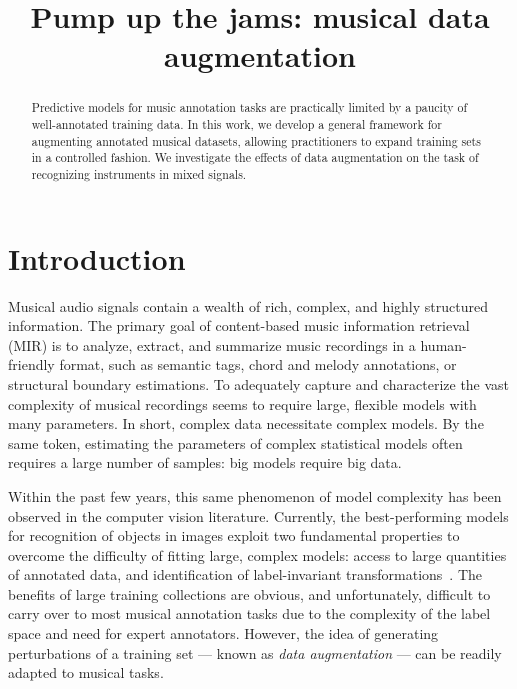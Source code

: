 \documentclass{article}
\title{Pump up the jams: musical data augmentation}
\begin{document}
%
\maketitle
%
\begin{abstract}
Predictive models for music annotation tasks are practically limited by a paucity of
well-annotated training data.
In this work, we develop a general framework for augmenting annotated musical datasets,
allowing practitioners to expand training sets in a controlled fashion.
We investigate the effects of data augmentation on the task of recognizing instruments
in mixed signals.
\end{abstract}
%
\section{Introduction}
\label{sec:introduction}


Musical audio signals contain a wealth of rich, complex, and highly structured
information.  The primary goal of content-based music information retrieval (MIR) is to
analyze, extract, and summarize music recordings in a human-friendly
format, such as semantic tags, chord and melody annotations, or structural boundary
estimations.  To adequately capture and characterize the vast complexity of musical
recordings seems to require large, flexible models with many parameters.  
In short, complex data necessitate complex models.
By the same token, estimating the parameters of complex statistical models often requires
a large number of samples: big models require big data.

Within the past few years, this same phenomenon of model complexity has been observed 
in the computer vision literature.  Currently, the best-performing models for recognition 
of objects in images exploit two fundamental properties to overcome the difficulty of 
fitting large, complex models: access to large quantities of annotated data, and 
identification of label-invariant transformations~\cite{krizhevsky2012imagenet}.
The benefits of large training collections are obvious, and unfortunately, difficult to 
carry over to most musical annotation tasks due to the complexity of the label space and
need for expert annotators.  However, the idea of generating perturbations of a training
set --- known as \emph{data augmentation} --- can be readily adapted to musical tasks.
\end{document}
